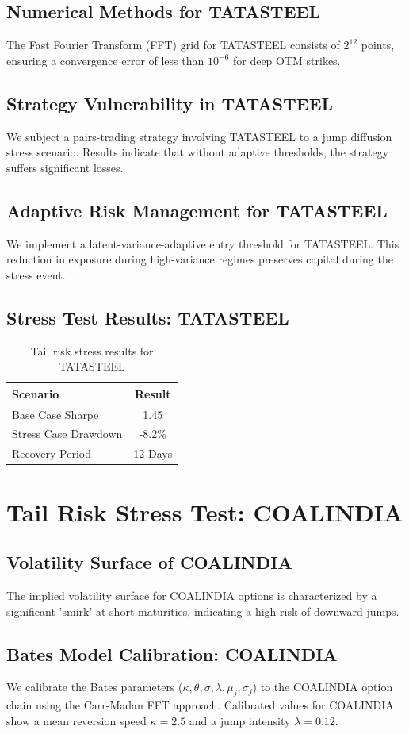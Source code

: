 \documentclass[12pt,a4paper,twoside]{article}
\begin{document}
\subsection{Numerical Methods for TATASTEEL}
The Fast Fourier Transform (FFT) grid for TATASTEEL consists of $2^{12}$ points, ensuring a convergence error of less than $10^{-6}$ for deep OTM strikes.
\subsection{Strategy Vulnerability in TATASTEEL}
We subject a pairs-trading strategy involving TATASTEEL to a jump diffusion stress scenario. Results indicate that without adaptive thresholds, the strategy suffers significant losses.
\subsection{Adaptive Risk Management for TATASTEEL}
We implement a latent-variance-adaptive entry threshold for TATASTEEL. This reduction in exposure during high-variance regimes preserves capital during the stress event.
\subsection{Stress Test Results: TATASTEEL}
\begin{table}[H]
\centering
\begin{tabular}{|l|c|}
\hline
Scenario & Result \\
\hline
Base Case Sharpe & 1.45 \\
Stress Case Drawdown & -8.2\% \\
Recovery Period & 12 Days \\
\hline
\end{tabular}
\caption{Tail risk stress results for TATASTEEL}
\end{table}
\newpage

\section{Tail Risk Stress Test: COALINDIA}
\subsection{Volatility Surface of COALINDIA}
The implied volatility surface for COALINDIA options is characterized by a significant 'smirk' at short maturities, indicating a high risk of downward jumps.
\subsection{Bates Model Calibration: COALINDIA}
We calibrate the Bates parameters ($\kappa, \theta, \sigma, \lambda, \mu_j, \sigma_j$) to the COALINDIA option chain using the Carr-Madan FFT approach.
Calibrated values for COALINDIA show a mean reversion speed $\kappa = 2.5$ and a jump intensity $\lambda = 0.12$.
\end{document}
